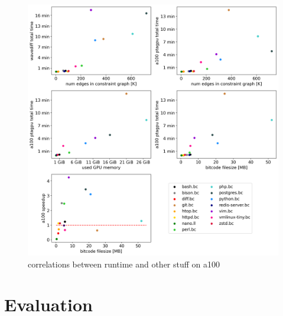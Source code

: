 \begin{figure}
    \centering
    \includegraphics[width=.9\textwidth]{img/correlations-a100.png}
    \caption{correlations between runtime and other stuff on a100}
    \label{fig:correlations-a100}
\end{figure}

\section{Evaluation}
